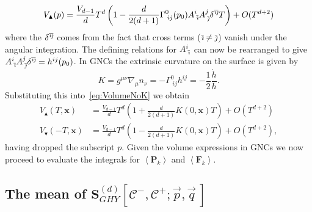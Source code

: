 \documentclass[12pt]{article}
\newcommand{\be}{\begin{equation}}
\newcommand{\ee}{\end{equation}}
\newcommand{\BF}[1]{\mathbf{F}_{#1}}
\newcommand{\BP}[1]{\mathbf{P}_{#1}}
\newcommand{\ibar}{{\overline{\emph\i}}}
\newcommand{\jbar}{{\overline{\emph\j}}}
\begin{document}
\be\label{eq:VolumeNoK}
V_\blacktriangle (p)
=\frac{V_{d-1}}{d}T^d\left (1-\frac{d}{2 (d+1)}\Gamma^{0}_{\;ij} (p_0)A^{i}_{\;\ibar}A^{j}_{\;\jbar}\delta^{\ibar\jbar}T\right)
+O (T^{d+2})
\ee
where the $\delta^{\ibar\jbar}$ comes from the fact that cross terms ($\ibar\neq \jbar$) vanish under the angular integration. The defining relations for $A^{i}_{\;\ibar}$ can now be rearranged to give $A^{i}_{\;\ibar}A^{j}_{\;\jbar}\delta^{\ibar\jbar}=h^{ij} (p_0)$. In GNCs the extrinsic curvature on the surface is given by
\be\label{eq:K}
K
=g^{\mu\nu }\nabla_{\mu}n_{\nu}
=-\Gamma^{0}_{\;ij}h^{ij}=-\frac{1}{2}\frac{\dot{h}}{h}.
\ee
Substituting this into~\eqref{eq:VolumeNoK} we obtain 
\begin{align}
V_\blacktriangle (T,\mathbf x)
&=\frac{V_{d-1}}{d}T^d\left (1+\frac{d}{2 (d+1)}K (0,\mathbf{x})T\right)
+O (T^{d+2}) \label{eq:TopVolumeWithK}\\
V_\blacktriangledown (-T,\mathbf x)
&=\frac{V_{d-1}}{d}T^d\left (1-\frac{d}{2 (d+1)}K (0,\mathbf{x})T\right)
+O (T^{d+2}), \label{eq:BottomVolumeWithK}
\end{align}
having dropped the subscript $p$. Given the volume expressions in GNCs we now proceed to evaluate the integrals for $\left\langle \BP{k}\right\rangle$ and $\left\langle \BF{k}\right\rangle$.

\subsection{The mean of $\textbf{S}^{ (d)}_{GHY}\left[\mathcal {C}^-,\mathcal{C}^+;\vec{p},\vec{q}\,\right]$}
\end{document}
